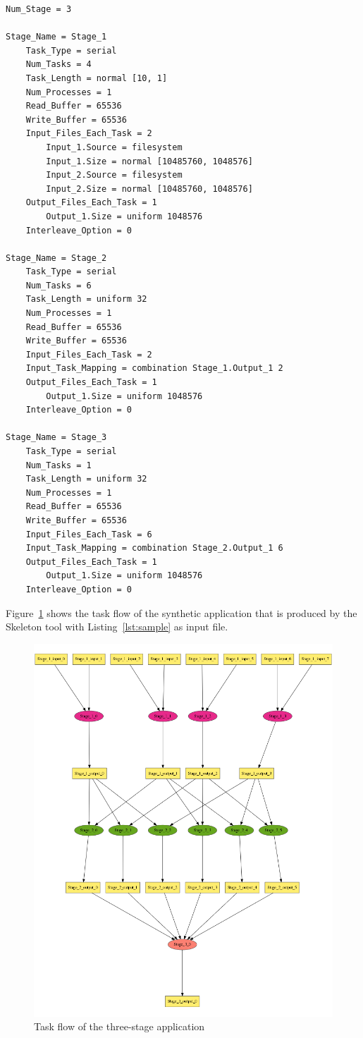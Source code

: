 \documentclass[10pt,a4paper]{article}
\begin{document}
\begin{lstlisting}[caption=Sample input for a three-stage application, label=lst:sample, linewidth=1.0\textwidth, xleftmargin=2.5ex]
Num_Stage = 3

Stage_Name = Stage_1
    Task_Type = serial
    Num_Tasks = 4  
    Task_Length = normal [10, 1]
    Num_Processes = 1
    Read_Buffer = 65536
    Write_Buffer = 65536
    Input_Files_Each_Task = 2
        Input_1.Source = filesystem
        Input_1.Size = normal [10485760, 1048576]
        Input_2.Source = filesystem
        Input_2.Size = normal [10485760, 1048576]
    Output_Files_Each_Task = 1
        Output_1.Size = uniform 1048576
    Interleave_Option = 0

Stage_Name = Stage_2
    Task_Type = serial
    Num_Tasks = 6
    Task_Length = uniform 32
    Num_Processes = 1
    Read_Buffer = 65536
    Write_Buffer = 65536
    Input_Files_Each_Task = 2
    Input_Task_Mapping = combination Stage_1.Output_1 2
    Output_Files_Each_Task = 1
        Output_1.Size = uniform 1048576
    Interleave_Option = 0

Stage_Name = Stage_3
    Task_Type = serial
    Num_Tasks = 1
    Task_Length = uniform 32
    Num_Processes = 1
    Read_Buffer = 65536
    Write_Buffer = 65536
    Input_Files_Each_Task = 6
    Input_Task_Mapping = combination Stage_2.Output_1 6
    Output_Files_Each_Task = 1
        Output_1.Size = uniform 1048576
    Interleave_Option = 0    
\end{lstlisting}


Figure~\ref{fig:sample} shows the task flow of the synthetic application that is produced by the Skeleton tool with Listing~\ref{lst:sample} as input file.

\begin{figure}
   \includegraphics[width=120mm]{picture/sample}
\caption {Task flow of the three-stage application
   \label{fig:sample}
}
\end{figure}
\end{document}
